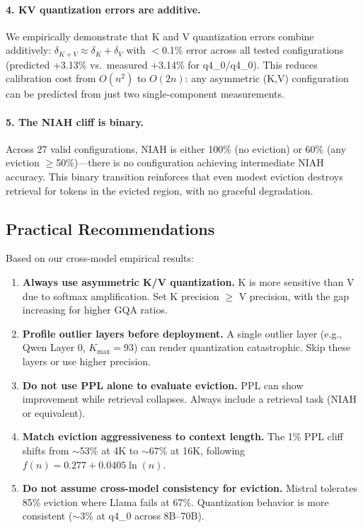 \paragraph{4. KV quantization errors are additive.}
We empirically demonstrate that K and V quantization errors combine additively: $\delta_{K+V} \approx \delta_K + \delta_V$ with $<$0.1\% error across all tested configurations (predicted +3.13\% vs.\ measured +3.14\% for q4\_0/q4\_0). This reduces calibration cost from $O(n^2)$ to $O(2n)$: any asymmetric (K,V) configuration can be predicted from just two single-component measurements.

\paragraph{5. The NIAH cliff is binary.}
Across 27 valid configurations, NIAH is either 100\% (no eviction) or 60\% (any eviction $\geq$50\%)---there is no configuration achieving intermediate NIAH accuracy. This binary transition reinforces that even modest eviction destroys retrieval for tokens in the evicted region, with no graceful degradation.

\subsection{Practical Recommendations}

Based on our cross-model empirical results:

\begin{enumerate}
    \item \textbf{Always use asymmetric K/V quantization.} K is more sensitive than V due to softmax amplification. Set K precision $\geq$ V precision, with the gap increasing for higher GQA ratios.
    \item \textbf{Profile outlier layers before deployment.} A single outlier layer (e.g., Qwen Layer 0, $K_\text{max}=93$) can render quantization catastrophic. Skip these layers or use higher precision.
    \item \textbf{Do not use PPL alone to evaluate eviction.} PPL can show improvement while retrieval collapses. Always include a retrieval task (NIAH or equivalent).
    \item \textbf{Match eviction aggressiveness to context length.} The 1\% PPL cliff shifts from $\sim$53\% at 4K to $\sim$67\% at 16K, following $f(n) = 0.277 + 0.0405 \ln(n)$.
    \item \textbf{Do not assume cross-model consistency for eviction.} Mistral tolerates 85\% eviction where Llama fails at 67\%. Quantization behavior is more consistent ($\sim$3\% at q4\_0 across 8B--70B).
\end{enumerate}

